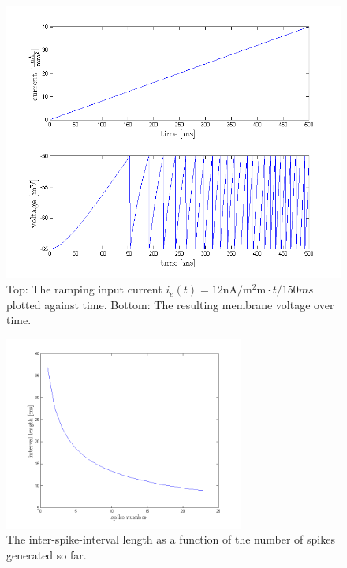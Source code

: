 \documentclass{scrartcl}
\begin{document}
\begin{figure}
\centering
\includegraphics[trim = {1.1cm 0 1.7cm 1.1cm}, width=\textwidth, clip]{../pics/ramp}
\caption{Top: The ramping input current $i_e(t) = 12 \si{\nano\ampere\per\square\milli\meter} \cdot t / 150 \si{ms}$ plotted against time. Bottom: The resulting membrane voltage over time.}
\label{ramp}
\end{figure}

\begin{figure}
\centering
\includegraphics[trim = {1.3cm 0 1.8cm 0.9cm}, width=0.7\textwidth, clip]{../pics/ramp_intervals}
\caption{The inter-spike-interval length as a function of the number of spikes generated so far.}
\label{intervals}
\end{figure}

\end{document}
